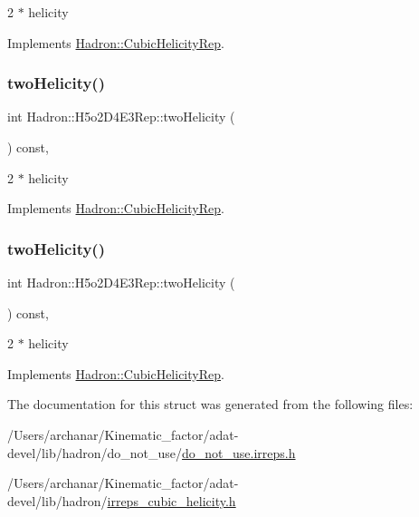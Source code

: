 2 $\ast$ helicity 

Implements \mbox{\hyperlink{structHadron_1_1CubicHelicityRep_af507aa56fc2747eacc8cb6c96db31ecc}{Hadron\+::\+Cubic\+Helicity\+Rep}}.

\mbox{\label{structHadron_1_1H5o2D4E3Rep_aafa508ed82fe94a7f52855aa9b8a4c74}} 
\subsubsection{\texorpdfstring{twoHelicity()}{twoHelicity()}\hspace{0.1cm}{\footnotesize\ttfamily [2/3]}}
{\footnotesize\ttfamily int Hadron\+::\+H5o2\+D4\+E3\+Rep\+::two\+Helicity (\begin{DoxyParamCaption}{ }\end{DoxyParamCaption}) const\hspace{0.3cm}{\ttfamily [inline]}, {\ttfamily [virtual]}}

2 $\ast$ helicity 

Implements \mbox{\hyperlink{structHadron_1_1CubicHelicityRep_af507aa56fc2747eacc8cb6c96db31ecc}{Hadron\+::\+Cubic\+Helicity\+Rep}}.

\mbox{\label{structHadron_1_1H5o2D4E3Rep_aafa508ed82fe94a7f52855aa9b8a4c74}} 
\subsubsection{\texorpdfstring{twoHelicity()}{twoHelicity()}\hspace{0.1cm}{\footnotesize\ttfamily [3/3]}}
{\footnotesize\ttfamily int Hadron\+::\+H5o2\+D4\+E3\+Rep\+::two\+Helicity (\begin{DoxyParamCaption}{ }\end{DoxyParamCaption}) const\hspace{0.3cm}{\ttfamily [inline]}, {\ttfamily [virtual]}}

2 $\ast$ helicity 

Implements \mbox{\hyperlink{structHadron_1_1CubicHelicityRep_af507aa56fc2747eacc8cb6c96db31ecc}{Hadron\+::\+Cubic\+Helicity\+Rep}}.



The documentation for this struct was generated from the following files\+:\begin{DoxyCompactItemize}
\item 
/\+Users/archanar/\+Kinematic\+\_\+factor/adat-\/devel/lib/hadron/do\+\_\+not\+\_\+use/\mbox{\hyperlink{adat-devel_2lib_2hadron_2do__not__use_2do__not__use_8irreps_8h}{do\+\_\+not\+\_\+use.\+irreps.\+h}}\item 
/\+Users/archanar/\+Kinematic\+\_\+factor/adat-\/devel/lib/hadron/\mbox{\hyperlink{adat-devel_2lib_2hadron_2irreps__cubic__helicity_8h}{irreps\+\_\+cubic\+\_\+helicity.\+h}}\end{DoxyCompactItemize}
